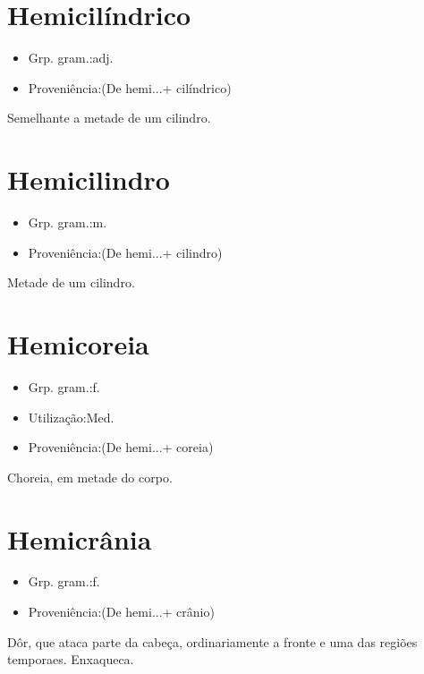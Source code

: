 \documentclass{article}
\begin{document}
\section{Hemicilíndrico}
\begin{itemize}
\item {Grp. gram.:adj.}
\end{itemize}
\begin{itemize}
\item {Proveniência:(De \textunderscore hemi...\textunderscore  + \textunderscore cilíndrico\textunderscore )}
\end{itemize}
Semelhante a metade de um cilindro.
\section{Hemicilindro}
\begin{itemize}
\item {Grp. gram.:m.}
\end{itemize}
\begin{itemize}
\item {Proveniência:(De \textunderscore hemi...\textunderscore  + \textunderscore cilindro\textunderscore )}
\end{itemize}
Metade de um cilindro.
\section{Hemicoreia}
\begin{itemize}
\item {Grp. gram.:f.}
\end{itemize}
\begin{itemize}
\item {Utilização:Med.}
\end{itemize}
\begin{itemize}
\item {Proveniência:(De \textunderscore hemi...\textunderscore  + \textunderscore coreia\textunderscore )}
\end{itemize}
Choreia, em metade do corpo.
\section{Hemicrânia}
\begin{itemize}
\item {Grp. gram.:f.}
\end{itemize}
\begin{itemize}
\item {Proveniência:(De \textunderscore hemi...\textunderscore  + \textunderscore crânio\textunderscore )}
\end{itemize}
Dôr, que ataca parte da cabeça, ordinariamente a fronte e uma das regiões temporaes.
Enxaqueca.
\end{document}
